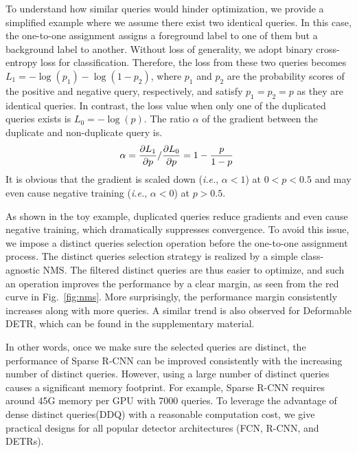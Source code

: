 \documentclass[10pt,twocolumn,letterpaper]{article}
\begin{document}
To understand how similar queries would hinder optimization, we provide a simplified example where we assume there exist two identical queries. In this case, the one-to-one assignment assigns a foreground label to one of them but a background label to another. Without loss of generality, we adopt binary cross-entropy loss for classification. Therefore, the loss from these two queries becomes $L_1=-\log(p_1) - \log(1 - p_2)$, where $p_1$ and $p_2$ are the probability scores of the positive and negative query, respectively, and satisfy $p_1 = p_2 = p$ as they are identical queries. In contrast, the loss value when only one of the duplicated queries exists is $L_0=-\log(p)$. The ratio $\alpha$ of the gradient between the duplicate and non-duplicate query is.
\vspace{-2mm}
\begin{equation}
\alpha = \frac{\partial L_1}{ \partial p} / \frac{\partial L_0}{ \partial p}  = 1 - \frac{p}{1-p} \
\vspace{-1mm}
\end{equation}
It is obvious that the gradient is scaled down (\emph{i.e.}, $\alpha < 1$) at $0<p<0.5$ and may even cause negative training (\emph{i.e.}, $\alpha < 0$) at $p > 0.5$.

As shown in the toy example, duplicated queries reduce gradients and even cause negative training, which dramatically suppresses convergence. To avoid this issue, we impose a distinct queries selection operation before the one-to-one assignment process.  The distinct queries selection strategy is realized by a simple class-agnostic NMS. The filtered distinct queries are thus easier to optimize, and such an operation improves the performance by a clear margin, as seen from the red curve in Fig.~\ref{fig:nms}. More surprisingly, the performance margin consistently increases along with more queries. A similar trend is also observed for Deformable DETR, which can be found in the supplementary material. 

In other words, once we make sure the selected queries are distinct, the performance of Sparse R-CNN can be improved consistently with the increasing number of distinct queries. However, using a large number of distinct queries causes a significant memory footprint. For example, Sparse R-CNN requires around 45G memory per GPU with 7000 queries. To leverage the advantage of dense distinct queries(DDQ) with a reasonable computation cost, we give practical designs for all popular detector architectures (FCN, R-CNN, and DETRs).
\end{document}
